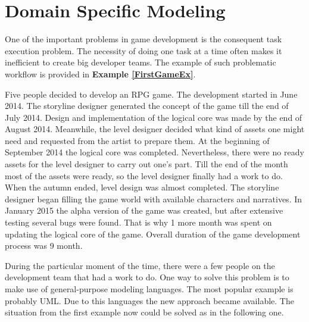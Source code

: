 \section{Domain Specific Modeling}

One of the important problems in game development is the consequent task execution problem. The necessity of doing one task at a time often makes it inefficient to create big developer teams. The example of such problematic workflow is provided in \textbf{Example  \ref{FirstGameEx}}.

\begin{example}
\label{FirstGameEx}
   Five people decided to develop an RPG game. The development started in June 2014. The storyline designer generated the concept of the game till the end of July 2014. Design and implementation of the logical core was made by the end  of August 2014. Meanwhile, the level designer decided what kind of assets one might need and requested from the artist to prepare them. At the beginning of September 2014 the logical core was completed. Nevertheless, there were no ready assets for the level designer to carry out one's part. Till the end of the month most of the assets were ready, so the level designer finally had a work to do. When the autumn ended, level design was almost completed. The storyline designer began filling the game world with available characters and narratives. In January 2015 the alpha version of the game was created, but after extensive testing several bugs were found. That is why 1 more month was spent on updating the logical core of the game. Overall duration of the game development process was 9 month.
\end{example}\par
 During the particular moment of the time, there were a few people on the development team that had a work to do.
 One way to solve this problem is to make use of general-purpose modeling languages.
 The most popular example is probably UML. Due to this languages the new approach became available. The situation from the first example now could be solved as in the following one.
